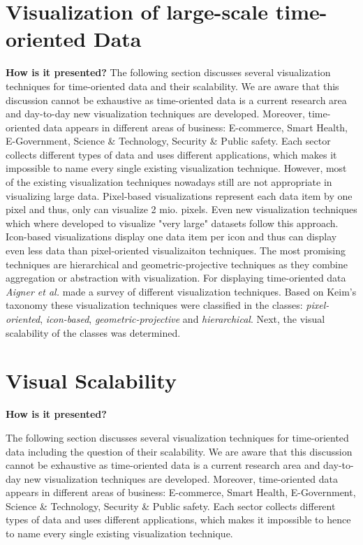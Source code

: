 \section{Visualization of large-scale time-oriented Data}
\textbf{How is it presented?}
The following section discusses several visualization techniques for time-oriented data and their scalability. We are aware that this discussion cannot be exhaustive as time-oriented data is a current research area and day-to-day new visualization techniques are developed.
Moreover, time-oriented data appears in different areas of business: E-commerce, Smart Health, E-Government, Science \& Technology, Security \& Public safety. Each sector collects different types of data and uses different applications, which makes it impossible to name every single existing visualization technique.
However, most of the existing visualization techniques nowadays still are not appropriate in visualizing large data. Pixel-based visualizations represent each data item by one pixel and thus, only can visualize 2 mio. pixels. Even new visualization techniques which where developed to visualize "very large" datasets follow this approach\cite{Keim1995, Keim1996}. Icon-based visualizations display one data item per icon and thus can display even less data than pixel-oriented visualizaiton techniques. The most promising techniques are hierarchical and geometric-projective techniques as they combine aggregation or abstraction with visualization. 
For displaying time-oriented data \textit{Aigner et al.} made a survey of different visualization techniques. Based on Keim's taxonomy\cite{Keim1995} these visualization techniques were classified in the classes: \textit{pixel-oriented}, \textit{icon-based}, \textit{geometric-projective} and \textit{hierarchical}. Next, the visual scalability of the classes was determined. 

\section{Visual Scalability}

\iffalse
\textbf{How is it presented?}


The following section discusses several visualization techniques for time-oriented data including the question of their scalability. We are aware that this discussion cannot be exhaustive as time-oriented data is a current research area and day-to-day new visualization techniques are developed.
Moreover, time-oriented data appears in different areas of business: E-commerce, Smart Health, E-Government, Science \& Technology, Security \& Public safety. Each sector collects different types of data and uses different applications, which makes it impossible to hence to name every single existing visualization technique.

